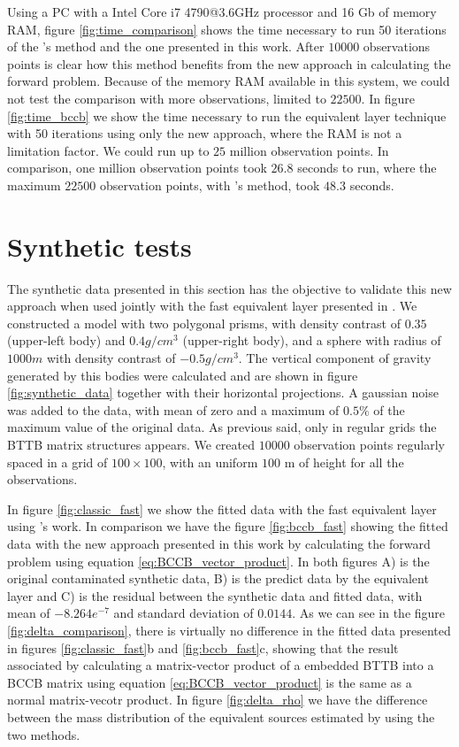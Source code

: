 \documentclass[paper]{geophysics}
\begin{document}
Using a PC with a Intel Core i7 4790@3.6GHz processor and 16 Gb of memory RAM, figure \ref{fig:time_comparison} shows the time necessary to run 50 iterations of the \cite{siqueira2017fast}'s method and the one presented in this work. After $10000$ observations points is clear how this method benefits from the new approach in calculating the forward problem. Because of the memory RAM available in this system, we could not test the comparison with more observations, limited to $22500$. In figure \ref{fig:time_bccb} we show the time necessary to run the equivalent layer technique with 50 iterations using only the new approach, where the RAM is not a limitation factor. We could run up to $25$ million observation points. In comparison, one million observation points took $26.8$ seconds to run, where the maximum $22500$ observation points, with \cite{siqueira2017fast}'s method, took $48.3$ seconds.

\section{Synthetic tests}
The synthetic data presented in this section has the objective to validate this new approach when used jointly with the fast equivalent layer presented in \cite{siqueira2017fast}. We constructed a model with two polygonal prisms, with density contrast of $0.35$ (upper-left body) and $0.4 g/cm^3$ (upper-right body), and a sphere with radius of $1000 m$ with density contrast of $-0.5 g/cm^3$. The vertical component of gravity generated by this bodies were calculated and are shown in figure \ref{fig:synthetic_data} together with their horizontal projections. A gaussian noise was added to the data, with mean of zero and a maximum of $0.5\%$ of the maximum value of the original data. As previous said, only in regular grids the BTTB matrix structures appears. We created $10000$ observation points regularly spaced in a grid of $100 \times 100$, with an uniform $100$ m of height for all the observations.

In figure \ref{fig:classic_fast} we show the fitted data with the fast equivalent layer using \cite{siqueira2017fast}'s work. In comparison we have the figure \ref{fig:bccb_fast} showing the fitted data with the new approach presented in this work by calculating the forward problem using equation \ref{eq:BCCB_vector_product}. In both figures A) is the original contaminated synthetic data, B) is the predict data by the equivalent layer and C) is the residual between the synthetic data and fitted data, with mean of $-8.264e^{-7}$ and standard deviation of $0.0144$. As we can see in the figure \ref{fig:delta_comparison}, there is virtually no difference in the fitted data presented in figures \ref{fig:classic_fast}b and \ref{fig:bccb_fast}c, showing that the result associated by calculating a matrix-vector product of a embedded BTTB into a BCCB matrix using equation \ref{eq:BCCB_vector_product} is the same as a normal matrix-vecotr product. In figure \ref{fig:delta_rho} we have the difference between the mass distribution of the equivalent sources estimated by using the two methods. 
\end{document}
